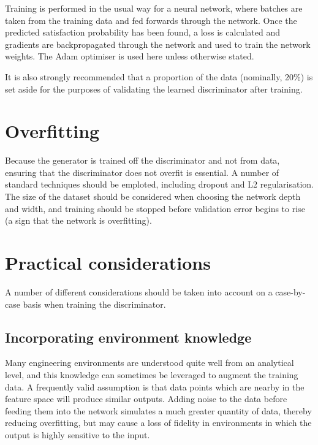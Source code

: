 \documentclass[../../main.tex]{subfiles}
\begin{document}
Training is performed in the usual way for a neural network, where batches are taken from the training data and fed forwards through the network.
Once the predicted satisfaction probability has been found, a loss is calculated and gradients are backpropagated through the network and used to train the network weights.
The Adam optimiser is used here unless otherwise stated.

It is also strongly recommended that a proportion of the data (nominally, 20\%) is set aside for the purposes of validating the learned discriminator after training.

\section{Overfitting} \label{section:overfitting}

Because the generator is trained off the discriminator and not from data, ensuring that the discriminator does not overfit is essential.
A number of standard techniques should be emploted, including dropout and L2 regularisation.
The size of the dataset should be considered when choosing the network depth and width, and training should be stopped before validation error begins to rise (a sign that the network is overfitting).

\section{Practical considerations} \label{section:practicalConsiderations}

A number of different considerations should be taken into account on a case-by-case basis when training the discriminator.

\subsection{Incorporating environment knowledge} \label{subsection:incorporatingEnvironmentKnowledge}

Many engineering environments are understood quite well from an analytical level, and this knowledge can sometimes be leveraged to augment the training data.
A frequently valid assumption is that data points which are nearby in the feature space will produce similar outputs.
Adding noise to the data before feeding them into the network simulates a much greater quantity of data, thereby reducing overfitting, but may cause a loss of fidelity in environments in which the output is highly sensitive to the input.
\end{document}
